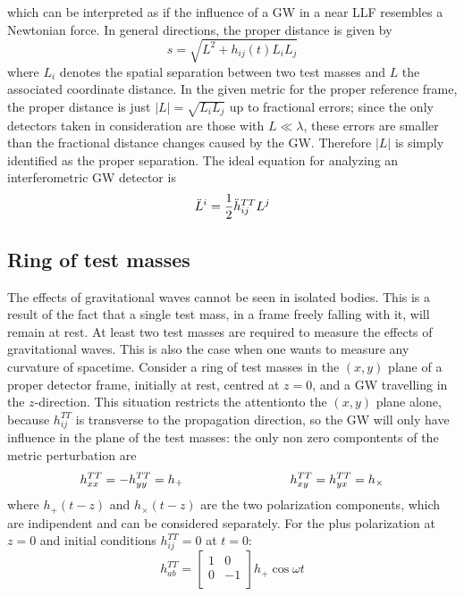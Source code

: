 \documentclass[binding=0.6cm, LaM]{sapthesis}
\begin{document}
which can be interpreted as if the influence of a GW in a near LLF resembles a Newtonian force.
In general directions, the proper distance is given by
\begin{equation}
s = \sqrt{L^2 + h_{ij}(t)L_{i}L_{j}}
\end{equation}
where $L_i$ denotes the spatial separation between two test masses and $L$ the associated coordinate distance.
In the given metric for the proper reference frame, the proper distance is just $|L| = \sqrt{L_iL_j}$ up to fractional errors; since the only detectors taken in consideration are those with $L \ll \lambda$, these errors are smaller than the fractional distance changes caused by the GW. Therefore $|L|$ is simply identified as the proper separation. The ideal equation for analyzing an interferometric GW detector is
\begin{equation}
{\ddot L}^i = {1 \over 2}{\ddot h}_{ij}^{TT}L^j
\end{equation}
 
\subsection{Ring of test masses}
The effects of gravitational waves cannot be seen in isolated bodies. This is a result of
the fact that a single test mass, in a frame freely falling with it, will remain at rest. At
least two test masses are required to measure the effects of gravitational waves. This is also
the case when one wants to measure any curvature of spacetime. 
Consider a ring of test masses in the $(x, y)$ plane of a proper detector frame, initially at rest, centred at $z = 0$, and a GW travelling in the $z$-direction. This situation restricts the attentionto the $(x,y)$ plane alone, because $h_{ij}^{TT}$ is transverse to the propagation direction, so the GW will only have influence in the plane of the test masses: the only non zero compontents of the metric perturbation are
\begin{equation}
h_{xx}^{TT} = - h_{yy}^{TT} = h_{+} \hspace*{3cm} h_{xy}^{TT} = h_{yx}^{TT} = h_{\times}
\end{equation}
where $h_{+}(t-z)$ and $h_{\times}(t-z)$ are the two polarization components, which are indipendent and can be considered separately.
For the plus polarization at $z=0$ and initial conditions $h_{ij}^{TT} = 0$ at $t=0$:
\begin{equation}
h_{ab}^{TT} = 
\begin{bmatrix}
1  & 0 \\
0 &  -1 \\
\end{bmatrix} 
h_{+}\cos \omega t
\end{equation}
\end{document}
